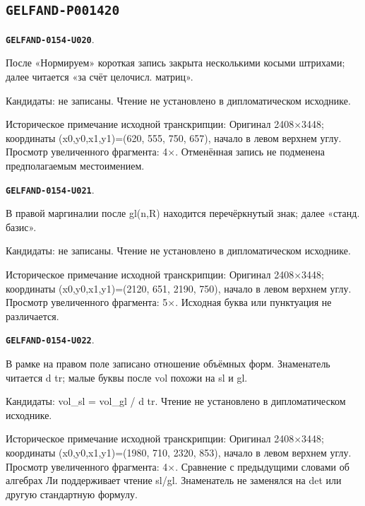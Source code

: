\documentclass[11pt]{article}
\theoremstyle{definition}
\theoremstyle{remark}
\begin{document}
\subsection*{\texttt{GELFAND-P001420}}
\par\noindent\leavevmode{}\label{GELFAND-0154-U020}\label{GELFAND-P001420:normalization-cancelled:note}\textbf{\texttt{GELFAND-0154-U020}}.\nopagebreak[4]\par
После «Нормируем» короткая запись закрыта несколькими косыми штрихами; далее читается «за счёт целочисл. матриц».\par
Кандидаты: не записаны. Чтение не установлено в дипломатическом исходнике.\par
Историческое примечание исходной транскрипции: Оригинал 2408×3448; координаты (x0,y0,x1,y1)=(620, 555, 750, 657), начало в левом верхнем углу. Просмотр увеличенного фрагмента: 4×. Отменённая запись не подменена предполагаемым местоимением.\par\medskip
\par\noindent\leavevmode{}\label{GELFAND-0154-U021}\label{GELFAND-P001420:margin-cancelled:note}\textbf{\texttt{GELFAND-0154-U021}}.\nopagebreak[4]\par
В правой маргиналии после gl(n,R) находится перечёркнутый знак; далее «станд. базис».\par
Кандидаты: не записаны. Чтение не установлено в дипломатическом исходнике.\par
Историческое примечание исходной транскрипции: Оригинал 2408×3448; координаты (x0,y0,x1,y1)=(2120, 651, 2190, 750), начало в левом верхнем углу. Просмотр увеличенного фрагмента: 5×. Исходная буква или пунктуация не различается.\par\medskip
\par\noindent\leavevmode{}\label{GELFAND-0154-U022}\label{GELFAND-P001420:margin-volume-formula:note}\textbf{\texttt{GELFAND-0154-U022}}.\nopagebreak[4]\par
В рамке на правом поле записано отношение объёмных форм. Знаменатель читается d tr; малые буквы после vol похожи на sl и gl.\par
Кандидаты: vol\_sl = vol\_gl / d tr. Чтение не установлено в дипломатическом исходнике.\par
Историческое примечание исходной транскрипции: Оригинал 2408×3448; координаты (x0,y0,x1,y1)=(1980, 710, 2320, 853), начало в левом верхнем углу. Просмотр увеличенного фрагмента: 4×. Сравнение с предыдущими словами об алгебрах Ли поддерживает чтение sl/gl. Знаменатель не заменялся на det или другую стандартную формулу.\par\medskip
\end{document}
